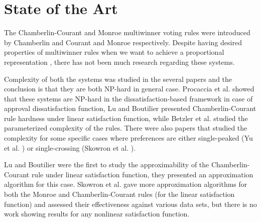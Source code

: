 \chapter{State of the Art}
\label{cha:stateArt}

The Chamberlin-Courant and Monroe multiwinner voting rules were introduced by Chamberlin and Courant \cite{9} and Monroe \cite{8} respectively. Despite having desired properties of multiwinner rules when we want to achieve a proportional representation \cite{10}, there has not been much research regarding these systems.

Complexity of both the systems was studied in the several papers and the conclusion is that they are both NP-hard in general case. Procaccia et al. \cite{2} showed that these systems are NP-hard in the dissatisfaction-based framework in case of approval dissatisfaction function, Lu and Boutilier \cite{4} presented Chamberlin-Courant rule hardness under linear satisfaction function, while Betzler et al. \cite{3} studied the parameterized complexity of the rules. There were also papers that studied the complexity for some specific cases where preferences are either single-peaked (Yu et al. \cite{11}) or single-crossing (Skowron et al. \cite{12}).

Lu and Boutilier \cite{4} were the first to study the approximability of the Chamberlin-Courant rule under linear satisfaction function, they presented an approximation algorithm for this case. Skowron et al. \cite{1} gave more approximation algorithms for both the Monroe and Chamberlin-Courant rules (for the linear satisfaction function) and assessed their effectiveness against various data sets, but there is no work showing results for any nonlinear satisfaction function.